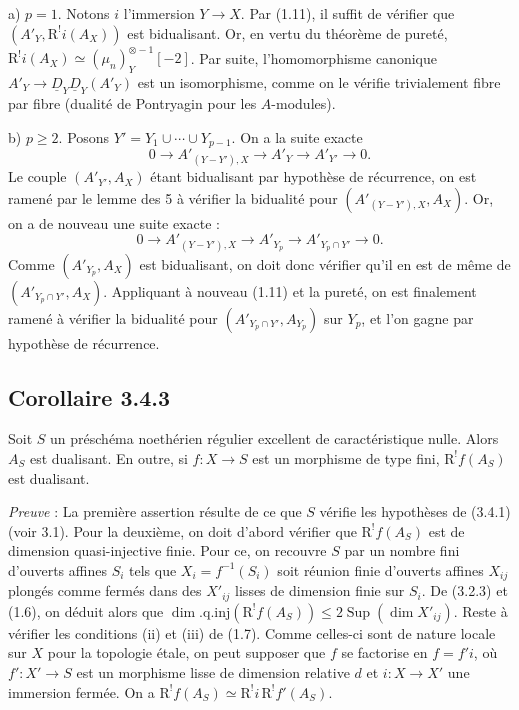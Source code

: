 \documentclass[11pt]{article}
\newcommand{\R}{\mathrm{R}}\newcommand{\RHomCore}{\mathrm{RHom}}
\providecommand{\R}{\mathrm R}
\begin{document}
a) $p = 1$. Notons $i$ l'immersion $Y \to X$. Par (1.11), il suffit de vérifier que $(A'_Y, \R^{!}i(A_X))$ est bidualisant. Or, en vertu du théorème de pureté, $\R^{!}i(A_X) \simeq (\mu_n)^{\otimes -1}_Y[-2]$. Par suite, l'homomorphisme canonique $A'_Y \to \underline{D}_Y \underline{D}_Y(A'_Y)$ est un isomorphisme, comme on le vérifie trivialement fibre par fibre (dualité de Pontryagin pour les $A$-modules).

b) $p \geqslant 2$. Posons $Y' = Y_1 \cup \cdots \cup Y_{p-1}$. On a la suite exacte
\[
0 \longrightarrow A'_{(Y-Y'),X} \longrightarrow A'_Y \longrightarrow A'_{Y'} \longrightarrow 0.
\]
Le couple $(A'_{Y'}, A_X)$ étant bidualisant par hypothèse de récurrence, on est ramené par le lemme des 5 à vérifier la bidualité pour $(A'_{(Y-Y'),X}, A_X)$. Or, on a de nouveau une suite exacte :
\[
0 \longrightarrow A'_{(Y-Y'),X} \longrightarrow A'_{Y_p} \longrightarrow A'_{Y_p \cap Y'} \longrightarrow 0.
\]
Comme $(A'_{Y_p}, A_X)$ est bidualisant, on doit donc vérifier qu'il en est de même de $(A'_{Y_p \cap Y'}, A_X)$. Appliquant à nouveau (1.11) et la pureté, on est finalement ramené à vérifier la bidualité pour $(A'_{Y_p \cap Y'}, A_{Y_p})$ sur $Y_p$, et l'on gagne par hypothèse de récurrence.

\subsection*{Corollaire 3.4.3}
Soit $S$ un préschéma noethérien régulier excellent de caractéristique nulle. Alors $A_S$ est dualisant. En outre, si $f : X \to S$ est un morphisme de type fini, $\R^{!}f(A_S)$ est dualisant.

\emph{Preuve} : La première assertion résulte de ce que $S$ vérifie les hypothèses de (3.4.1) (voir 3.1). Pour la deuxième, on doit d'abord vérifier que $\R^{!}f(A_S)$ est de dimension quasi-injective finie. Pour ce, on recouvre $S$ par un nombre fini d'ouverts affines $S_i$ tels que $X_i = f^{-1}(S_i)$ soit réunion finie d'ouverts affines $X_{ij}$ plongés comme fermés dans des $X'_{ij}$ lisses de dimension finie sur $S_i$. De (3.2.3) et (1.6), on déduit alors que $\dim.\mathrm{q.inj}(\R^{!}f(A_S)) \leqslant 2\operatorname{Sup}(\dim X'_{ij})$. Reste à vérifier les conditions (ii) et (iii) de (1.7). Comme celles-ci sont de nature locale sur $X$ pour la topologie étale, on peut supposer que $f$ se factorise en $f = f'i$, où $f' : X' \to S$ est un morphisme lisse de dimension relative $d$ et $i : X \to X'$ une immersion fermée. On a $\R^{!}f(A_S) \simeq \R^{!}i \, \R^{!}f'(A_S)$.
\end{document}
